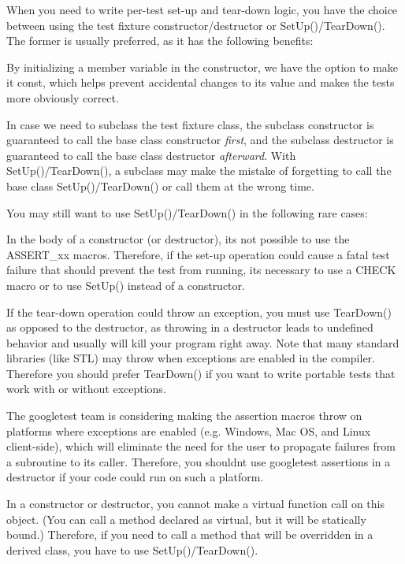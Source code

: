 When you need to write per-\/test set-\/up and tear-\/down logic, you have the choice between using the test fixture constructor/destructor or {\ttfamily Set\+Up()/\+Tear\+Down()}. The former is usually preferred, as it has the following benefits\+:


\begin{DoxyItemize}
\item By initializing a member variable in the constructor, we have the option to make it {\ttfamily const}, which helps prevent accidental changes to its value and makes the tests more obviously correct.
\item In case we need to subclass the test fixture class, the subclass\textquotesingle{} constructor is guaranteed to call the base class\textquotesingle{} constructor {\itshape first}, and the subclass\textquotesingle{} destructor is guaranteed to call the base class\textquotesingle{} destructor {\itshape afterward}. With {\ttfamily Set\+Up()/\+Tear\+Down()}, a subclass may make the mistake of forgetting to call the base class\textquotesingle{} {\ttfamily Set\+Up()/\+Tear\+Down()} or call them at the wrong time.
\end{DoxyItemize}

You may still want to use {\ttfamily Set\+Up()/\+Tear\+Down()} in the following rare cases\+:


\begin{DoxyItemize}
\item In the body of a constructor (or destructor), it\textquotesingle{}s not possible to use the {\ttfamily A\+S\+S\+E\+R\+T\+\_\+xx} macros. Therefore, if the set-\/up operation could cause a fatal test failure that should prevent the test from running, it\textquotesingle{}s necessary to use a {\ttfamily C\+H\+E\+CK} macro or to use {\ttfamily Set\+Up()} instead of a constructor.
\item If the tear-\/down operation could throw an exception, you must use {\ttfamily Tear\+Down()} as opposed to the destructor, as throwing in a destructor leads to undefined behavior and usually will kill your program right away. Note that many standard libraries (like S\+TL) may throw when exceptions are enabled in the compiler. Therefore you should prefer {\ttfamily Tear\+Down()} if you want to write portable tests that work with or without exceptions.
\item The googletest team is considering making the assertion macros throw on platforms where exceptions are enabled (e.\+g. Windows, Mac OS, and Linux client-\/side), which will eliminate the need for the user to propagate failures from a subroutine to its caller. Therefore, you shouldn\textquotesingle{}t use googletest assertions in a destructor if your code could run on such a platform.
\item In a constructor or destructor, you cannot make a virtual function call on this object. (You can call a method declared as virtual, but it will be statically bound.) Therefore, if you need to call a method that will be overridden in a derived class, you have to use {\ttfamily Set\+Up()/\+Tear\+Down()}.
\end{DoxyItemize}

